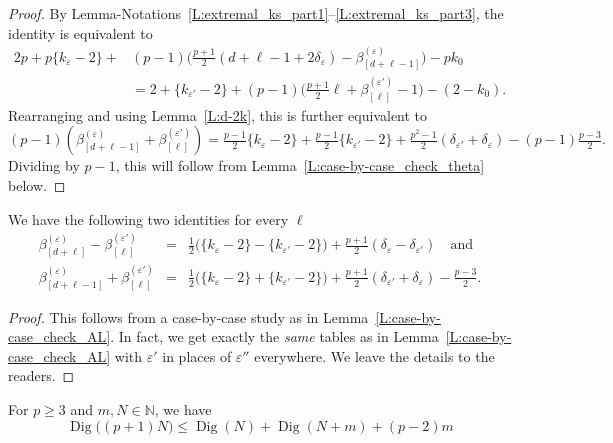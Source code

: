 \begin{proof}
    By Lemma-Notations~\ref{L:extremal_ks_part1}--\ref{L:extremal_ks_part3}, the identity is equivalent to
    \begin{align*}
    2p +p\{k_{\varepsilon} -2\} + &(p-1) \big(\tfrac{p+1}2 (d+\ell-1+2\delta_{\varepsilon}) -\beta_{[d+\ell-1]}^{(\varepsilon)}\big) - pk_0
    \\ & =
    2 +\{k_{\varepsilon'} -2\} + (p-1) \big(\tfrac{p+1}2 \ell +\beta_{[\ell]}^{(\varepsilon')}-1\big)   -(2-k_0).
    \end{align*}
    Rearranging and using Lemma~\ref{L:d-2k}, this is further equivalent to
    $$(p-1)(\beta_{[d+\ell-1]}^{(\varepsilon)}+ \beta_{[\ell]}^{(\varepsilon')})=
    \tfrac{p-1}2\{k_\varepsilon-2\} +\tfrac{p-1}2\{k_{\varepsilon'} - 2\} + \tfrac{p^2-1}2(\delta_{\varepsilon'} + \delta_\varepsilon) -(p-1)\tfrac{p-3}2.
    $$
    Dividing by $p-1$, this will follow from Lemma~\ref{L:case-by-case_check_theta} below.
\end{proof}

\begin{lemma}
    \label{L:case-by-case_check_theta}
    We have the following two identities for every $\ell$
    \begin{eqnarray*}
    \beta_{[d+\ell]}^{(\varepsilon)} - \beta_{[\ell]}^{(\varepsilon')} &=&  \tfrac 12\big(\{k _\varepsilon -2\} - \{k_{\varepsilon '}-2\}\big)+\tfrac{p+1}2( \delta_\varepsilon-\delta_{\varepsilon'})  \quad\textrm{and}
    \\
    \beta_{[d+\ell-1]}^{(\varepsilon)}+\beta_{[\ell]}^{(\varepsilon')}
    &=&
    \tfrac12\big(\{k_\varepsilon-2\} +\{k_{\varepsilon'}  - 2\}\big) + \tfrac{p+1}2(\delta_{\varepsilon'} + \delta_\varepsilon)-\tfrac{p-3}2.
    \end{eqnarray*}
\end{lemma}

\begin{proof}
    This follows from a case-by-case study as in Lemma~\ref{L:case-by-case_check_AL}. In fact, we get exactly the \emph{same} tables as in Lemma~\ref{L:case-by-case_check_AL} with $\varepsilon'$ in places of $\varepsilon''$ everywhere. We leave the details to the readers.
\end{proof}

\begin{lemma}
    \label{Diglemma}
    For $p\geq3$ and $m,N \in \mathbb{N}$,  we have
    	\[
    	{\operatorname{Dig}}\big((p+1)N \big) \leq {\operatorname{Dig}}(N)+ {\operatorname{Dig}}(N+m)+(p-2)m
    	\]
\end{lemma}

